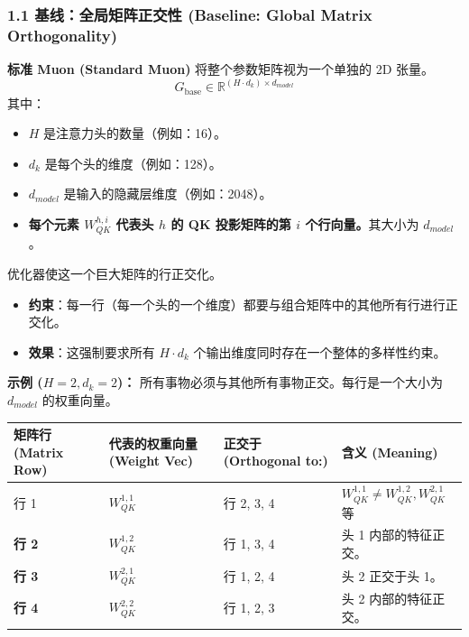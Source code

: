 \documentclass[12pt]{article}
\begin{document}
\subsubsection*{1.1 基线：全局矩阵正交性 (Baseline: Global Matrix Orthogonality)}
\textbf{标准 Muon (Standard Muon)} 将整个参数矩阵视为一个单独的 2D 张量。
$$G_{\text{base}} \in \mathbb{R}^{(H \cdot d_k) \times d_{model}}$$
其中：
\begin{itemize}
    \item $H$ 是注意力头的数量（例如：16）。
    \item $d_k$ 是每个头的维度（例如：128）。
    \item $d_{model}$ 是输入的隐藏层维度（例如：2048）。
    \item \textbf{每个元素 $W_{QK}^{h,i}$ 代表头 $h$ 的 QK 投影矩阵的第 $i$ 个行向量。}其大小为 $d_{model}$。
\end{itemize}

优化器使这一个巨大矩阵的行正交化。
\begin{itemize}
    \item \textbf{约束}：每一行（每一个头的一个维度）都要与组合矩阵中的其他所有行进行正交化。
    \item \textbf{效果}：这强制要求所有 $H \cdot d_k$ 个输出维度同时存在一个整体的多样性约束。
\end{itemize}

\textbf{示例 ($H=2, d_k=2$)：}
所有事物必须与其他所有事物正交。每行是一个大小为 $d_{model}$ 的权重向量。

\begin{table}[h]
\centering
\color{lighttext}
\begin{tabularx}{\textwidth}{l X X X}
\toprule
矩阵行 (Matrix Row) & 代表的权重向量 (Weight Vec) & 正交于 (Orthogonal to:) & 含义 (Meaning) \\
\midrule
行 1 & $W_{QK}^{1,1}$ & 行 2, 3, 4 & $W_{QK}^{1,1} \neq W_{QK}^{1,2}, W_{QK}^{2,1}$ 等 \\
\textbf{行 2} & $W_{QK}^{1,2}$ & 行 1, 3, 4 & 头 1 内部的特征正交。 \\
\textbf{行 3} & $W_{QK}^{2,1}$ & 行 1, 2, 4 & 头 2 正交于头 1。 \\
\textbf{行 4} & $W_{QK}^{2,2}$ & 行 1, 2, 3 & 头 2 内部的特征正交。 \\
\bottomrule
\end{tabularx}
\end{table}
\end{document}
